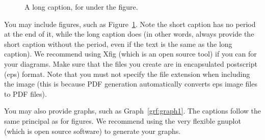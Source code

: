 \begin{figure}
	\caption[A short caption, for the figure list]{A long caption, for under the figure.}
	\label{fig:fig1}
\end{figure}
You may include figures, such as Figure~\ref{fig:fig1}. Note the short caption has no period at the end of it, while the long caption does (in other words, always provide the short caption without the period, even if the text is the same as the long caption). We recommend using Xfig (which is an open source tool) if you can for your diagrams. Make sure that the files you create are in encapsulated postscript (eps) format. Note that you must not specify the file extension when including the image (this is because PDF generation automatically converts eps image files to PDF files).

\begin{graph}
	\vspace{10pt}
	\caption[A short graph caption]{A long graph caption.}
	\label{grf:graph1}
\end{graph}
You may also provide graphs, such as Graph~\ref{grf:graph1}. The captions follow the same principal as for figures. We recommend using the very flexible gnuplot (which is open source software) to generate your graphs.

